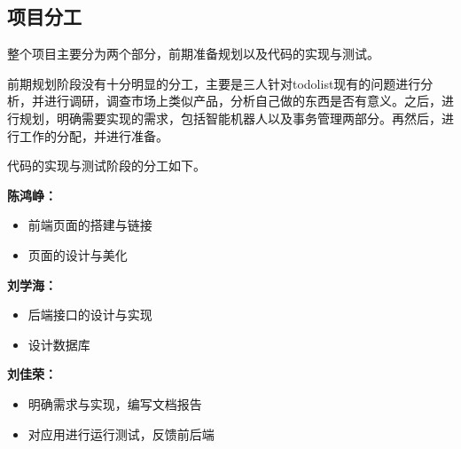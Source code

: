 \documentclass[a4paper, 11pt]{article}
\begin{document}
\subsection{项目分工}
\par 整个项目主要分为两个部分，前期准备规划以及代码的实现与测试。
\par 前期规划阶段没有十分明显的分工，主要是三人针对todolist现有的问题进行分析，并进行调研，调查市场上类似产品，分析自己做的东西是否有意义。之后，进行规划，明确需要实现的需求，包括智能机器人以及事务管理两部分。再然后，进行工作的分配，并进行准备。
\par 代码的实现与测试阶段的分工如下。
\par \textbf{陈鸿峥：}
\begin{itemize}
\item 前端页面的搭建与链接
\item 页面的设计与美化
\end{itemize}
\par \textbf{刘学海：}
\begin{itemize}
\item 后端接口的设计与实现
\item 设计数据库
\end{itemize}
\par \textbf{刘佳荣：}
\begin{itemize}
\item 明确需求与实现，编写文档报告
\item 对应用进行运行测试，反馈前后端
\end{itemize}
\end{document}
